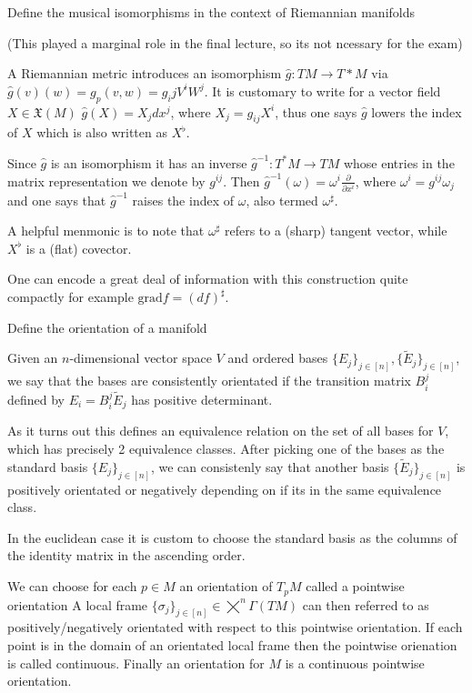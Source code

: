 Define the musical isomorphisms in the context of Riemannian manifolds

(This played a marginal role in the final lecture, so its not ncessary for the exam)

A Riemannian metric introduces an isomorphism \( \hat{g}: TM \to T*M \) via
\( \hat{g}(v)(w) = g_p(v,w)  = g_ij V^iW^j \).
It is customary to write for a vector field \( X \in \mathfrak{X}(M) \)
\( \hat{g}(X) = X_j dx^j \), where \( X_j = g_{ij}X^i \),
thus one says \( \hat{g} \) lowers the index of \( X \) which is also written
as \( X^\flat \).

Since \( \hat{g} \) is an isomorphism it has an inverse \( \hat{g}^{-1} : T^\ast M \to TM \)
whose entries in the matrix representation we denote by \( g^{ij} \).
Then 
\( \hat{g}^{-1}(\omega) = \omega^i \frac{\partial}{\partial x^i} \), where \( \omega^i = g^{ij} \omega_j \)
and one says that \( \hat{g}^{-1} \) raises the index of \( \omega \), also termed \( \omega^{\sharp} \).

A helpful menmonic is to note that \( \omega^\sharp \) refers to a (sharp) tangent vector,
while \( X^\flat \) is a (flat) covector.

One can encode a great deal of information with this construction quite compactly
for example \( \text{grad} f = (df)^\sharp \).


Define the orientation of a manifold

Given an \( n \)-dimensional vector space \( V \) and ordered bases \( \{E_j\}_{j \in [n]}, \{\tilde{E}_j\}_{j \in [n]} \),
we say that the bases are consistently orientated if the transition matrix \( B^j_i \) defined by
\( E_i = B^j_i \tilde{E}_j \) has positive determinant.

As it turns out this defines an equivalence relation on the set of all bases for \( V \), which has precisely 2 equivalence classes.
After picking one of the bases as the standard basis \( \{E_j\}_{j \in [n]} \), we can consistenly say that another basis 
\(\{\tilde{E}_j\}_{j \in [n]}\) is positively orientated or negatively depending on if its in the same equivalence class.

In the euclidean case it is custom to choose the standard basis as the columns of the identity matrix in the ascending order. 

We can choose for each \( p \in M \) an orientation of \( T_p M\) called a pointwise orientation
A local frame \( \{\sigma_j\}_{j \in [n]} \in \bigtimes^n \Gamma(TM) \) can then referred to as positively/negatively orientated 
with respect to this pointwise orientation. If each point is in the domain of an orientated local frame then the pointwise orienation is called continuous.
Finally an orientation for \( M \) is a continuous pointwise orientation.

